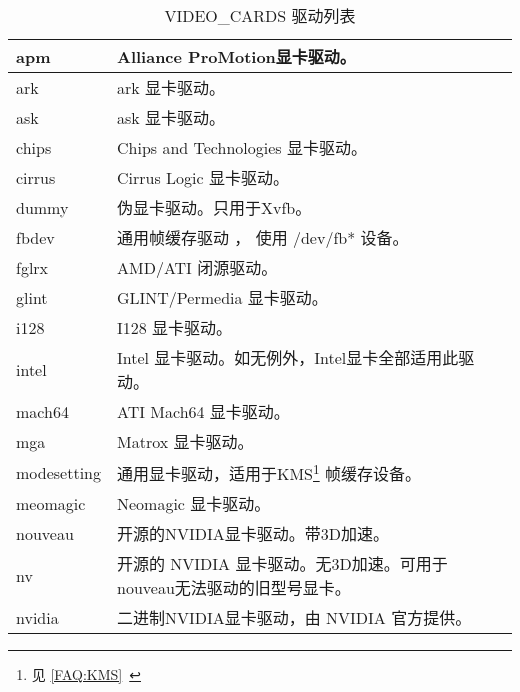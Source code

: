 \documentclass[amstex,twoside]{ctexbook}
\newcommand{\secref}[1]{ { \it节\ref{#1}~\nameref{#1}} }
\begin{document}
\begin{longtable}{|l|p{}|}
\caption{VIDEO\_CARDS 驱动列表}\label{table:videocards}\\
\hline
apm & Alliance ProMotion显卡驱动。 \\\hline
ark & ark 显卡驱动。 \\\hline
ask & ask 显卡驱动。 \\\hline
chips & Chips and Technologies 显卡驱动。 \\\hline
cirrus & Cirrus Logic 显卡驱动。\\\hline
dummy & 伪显卡驱动。只用于Xvfb。 \\\hline
fbdev & 通用帧缓存驱动 ， 使用 /dev/fb* 设备。 \\\hline
fglrx & AMD/ATI 闭源驱动。  \\\hline
glint & GLINT/Permedia 显卡驱动。 \\\hline
i128 & I128 显卡驱动。\\\hline
intel & Intel 显卡驱动。如无例外，Intel显卡全部适用此驱动。\\\hline
mach64 & ATI Mach64 显卡驱动。 \\\hline
mga & Matrox 显卡驱动。 \\\hline
modesetting & 通用显卡驱动，适用于KMS\footnote{见 \secref{FAQ:KMS} } 帧缓存设备。\\\hline
meomagic & Neomagic 显卡驱动。 \\\hline
nouveau & 开源的NVIDIA显卡驱动。带3D加速。 \\\hline
nv & 开源的 NVIDIA 显卡驱动。无3D加速。可用于nouveau无法驱动的旧型号显卡。 \\\hline
nvidia & 二进制NVIDIA显卡驱动，由 NVIDIA 官方提供。\\\hline

\end{longtable}
\end{document}
